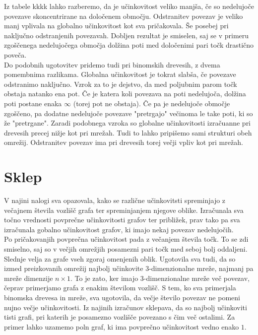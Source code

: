 \documentclass[a4paper, 16pt]{article}
\begin{document}
Iz tabele kkkk lahko razberemo, da je učinkovitost veliko manjša, če so nedelujoče povezave skoncentrirane na določenem območju. Odstranitev povezav je veliko manj vplivala na globalno učinkovitost kot sva pričakovala.
Še posebej pri naključno odstranjenih povezavah. Dobljen rezultat je smiselen, saj se v primeru zgoščenega nedelujočega območja dolžina poti med določenimi pari točk drastično poveča. \\
Do podobnih ugotovitev pridemo tudi pri binomskih drevesih, z dvema pomembnima razlikama. Globalna učinkovitost je tokrat slabša, če povezave odstranimo naključno. Vzrok za to je dejstvo, da med poljubnim parom točk obstaja natanko ena pot.
Če je katera koli povezava na poti nedelujoča, dolžina poti postane enaka $\infty$ (torej pot ne obstaja). Če pa je nedelujoče območje zgoščeno, pa dodatne nedelujoče povezave "pretrgajo" večinoma le take poti, ki so že "pretrgane". 
Zaradi podobnega vzroka so globalne učinkovitosti izračuanne pri drevesih precej nižje kot pri mrežah. Tudi to lahko pripišemo sami strukturi obeh omrežij. Odstranitev povezav ima pri drevesih torej večji vpliv
kot pri mrežah.

\section{Sklep}
V najini nalogi sva opazovala, kako se različne učinkovitsti spreminjajo z večajnem števila vozlišč grafa ter spreminjanjem njegove oblike. Izračunala sva točno vrednosti povprečne učinkovitosti grafov ter približek,
prav tako pa sva izračunala gobalno učinkovitost grafov, ki imajo nekaj povezav nedelujočih.\\


Po pričakovanjih povprečna učinkovitost pada z večanjem števila točk.
To se zdi smiselno, saj so v večjih omrežjih posamezni pari točk med seboj bolj oddaljeni.
Slednje velja za grafe vseh zgoraj omenjenih oblik. 
Ugotovila sva tudi, da so izmed preizkovanih omrežij najbolj učinkovite 3-dimenzionalne mreže, 
najmanj pa mreže dimenzije $n \times 1$. To je zato, ker imajo 3-dimenzionalne mreže več povezav, čeprav primerjamo grafa z enakim številom vozlišč.
S tem, ko sva primerjala binomska drevesa in mreže, sva ugotovila, da večje število povezav ne pomeni nujno večje učinkovitosti. 
Iz najinih izračunov sklepava, da so najbolj učinkoviti tisti grafi, pri katerih je posamezno vozlišče povezano s čim več ostalimi. 
Za primer lahko uzamemo poln graf, ki ima povprečno učinkovitost vedno enako $1$.\\
\end{document}
